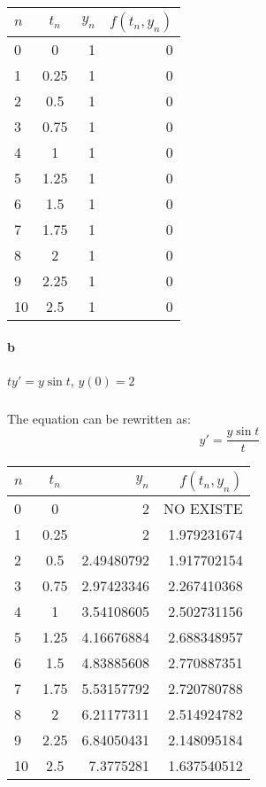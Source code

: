 \documentclass{article}
\begin{document}
\begin{table}[ht]
  \begin{center}
    \label{tab:table 2.a}
    \begin{tabular}{l|c|r|r} %
      $n$ & $t_{n}$ & $y_{n}$ & $f(t_{n},y_{n})$\\
      \hline
        0&0&1&0\\
        1&0.25&1&0\\
        2&0.5&1&0\\
        3&0.75&1&0\\
        4&1&1&0\\
        5&1.25&1&0\\
        6&1.5&1&0\\
        7&1.75&1&0\\
        8&2&1&0\\
        9&2.25&1&0\\
        10&2.5&1&0\\
    \end{tabular}
  \end{center}
\end{table}

\paragraph{b} $ty' = y\sin{t}$, $y(0)=2$
\subparagraph{} The equation can be rewritten as:
\[
    y' = \frac{y\sin{t}}{t}
\]

\begin{table}[ht]
  \begin{center}
    \label{tab:2.b}
    \begin{tabular}{l|c|r|r} %
      $n$ & $t_{n}$ & $y_{n}$ & $f(t_{n},y_{n})$\\
      \hline
        0&0&2&NO EXISTE\\
        1&0.25&2&1.979231674\\
        2&0.5&2.49480792&1.917702154\\
        3&0.75&2.97423346&2.267410368\\
        4&1&3.54108605&2.502731156\\
        5&1.25&4.16676884&2.688348957\\
        6&1.5&4.83885608&2.770887351\\
        7&1.75&5.53157792&2.720780788\\
        8&2&6.21177311&2.514924782\\
        9&2.25&6.84050431&2.148095184\\
        10&2.5&7.3775281&1.637540512\\
    \end{tabular}
  \end{center}
\end{table}
\end{document}
